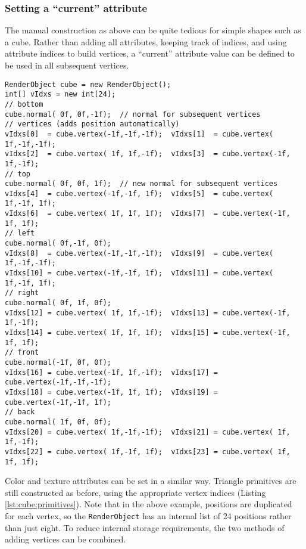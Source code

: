 \documentclass{article}
\begin{document}
\subsubsection{Setting a ``current'' attribute}

The manual construction as above can be quite tedious for simple shapes such as a cube.
Rather than adding all attributes, keeping track of indices, and using attribute indices
to build vertices, a ``current'' attribute value can be defined to be used in all subsequent 
vertices.
\begin{lstlisting}[caption={Construction of a cube using current attributes},label=lst:cube:current]
RenderObject cube = new RenderObject();
int[] vIdxs = new int[24];
// bottom
cube.normal( 0f, 0f,-1f);  // normal for subsequent vertices
// vertices (adds position automatically)
vIdxs[0]  = cube.vertex(-1f,-1f,-1f);  vIdxs[1]  = cube.vertex( 1f,-1f,-1f);
vIdxs[2]  = cube.vertex( 1f, 1f,-1f);  vIdxs[3]  = cube.vertex(-1f, 1f,-1f);
// top
cube.normal( 0f, 0f, 1f);  // new normal for subsequent vertices
vIdxs[4]  = cube.vertex(-1f,-1f, 1f);  vIdxs[5]  = cube.vertex( 1f,-1f, 1f);
vIdxs[6]  = cube.vertex( 1f, 1f, 1f);  vIdxs[7]  = cube.vertex(-1f, 1f, 1f);
// left
cube.normal( 0f,-1f, 0f);
vIdxs[8]  = cube.vertex(-1f,-1f,-1f);  vIdxs[9]  = cube.vertex( 1f,-1f,-1f);
vIdxs[10] = cube.vertex(-1f,-1f, 1f);  vIdxs[11] = cube.vertex( 1f,-1f, 1f);
// right
cube.normal( 0f, 1f, 0f);
vIdxs[12] = cube.vertex( 1f, 1f,-1f);  vIdxs[13] = cube.vertex(-1f, 1f,-1f);
vIdxs[14] = cube.vertex( 1f, 1f, 1f);  vIdxs[15] = cube.vertex(-1f, 1f, 1f);
// front
cube.normal(-1f, 0f, 0f);
vIdxs[16] = cube.vertex(-1f, 1f,-1f);  vIdxs[17] = cube.vertex(-1f,-1f,-1f);
vIdxs[18] = cube.vertex(-1f, 1f, 1f);  vIdxs[19] = cube.vertex(-1f,-1f, 1f);
// back
cube.normal( 1f, 0f, 0f);
vIdxs[20] = cube.vertex( 1f,-1f,-1f);  vIdxs[21] = cube.vertex( 1f, 1f,-1f);
vIdxs[22] = cube.vertex( 1f,-1f, 1f);  vIdxs[23] = cube.vertex( 1f, 1f, 1f);
\end{lstlisting}
Color and texture attributes can be set in a similar way.  Triangle primitives are 
still constructed as before, using the appropriate vertex indices (Listing \ref{lst:cube:primitives}).
Note that in the above example, positions are duplicated for each vertex, so the
\lstinline{RenderObject} has an internal list of 24 positions rather than just
eight.  To reduce internal storage requirements, the two methods of adding
vertices can be combined.
\end{document}
